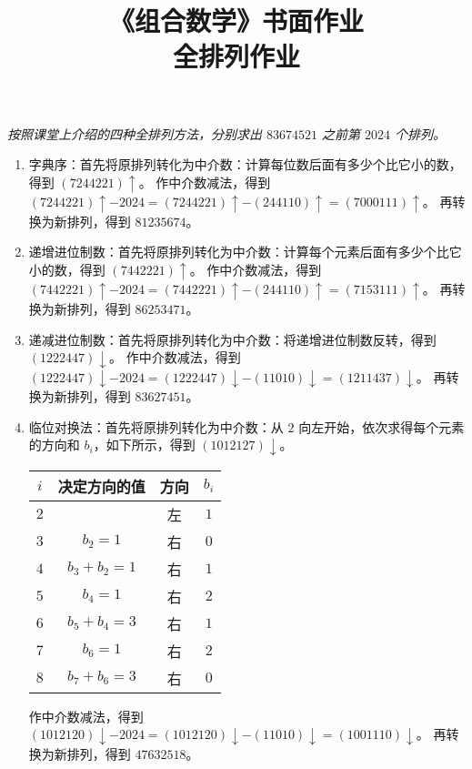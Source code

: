 \documentclass{article}
\title{《组合数学》书面作业 \\
       \large 全排列作业}
\begin{document}
\maketitle

\textit{按照课堂上介绍的四种全排列方法，分别求出 $ 83674521 $ 之前第 $ 2024 $ 个排列。}

\begin{enumerate}
    \item 字典序：首先将原排列转化为中介数：计算每位数后面有多少个比它小的数，得到 $ (7244221)\uparrow $。
    作中介数减法，得到 $ (7244221)\uparrow - 2024 = (7244221)\uparrow - (244110)\uparrow = (7000111)\uparrow $。
    再转换为新排列，得到 $ 81235674 $。
    \item 递增进位制数：首先将原排列转化为中介数：计算每个元素后面有多少个比它小的数，得到 $ (7442221)\uparrow $。
    作中介数减法，得到 $ (7442221)\uparrow - 2024 = (7442221)\uparrow - (244110)\uparrow = (7153111)\uparrow $。
    再转换为新排列，得到 $ 86253471 $。
    \item 递减进位制数：首先将原排列转化为中介数：将递增进位制数反转，得到 $ (1222447)\downarrow $。
    作中介数减法，得到 $ (1222447)\downarrow - 2024 = (1222447)\downarrow - (11010)\downarrow = (1211437)\downarrow $。
    再转换为新排列，得到 $ 83627451 $。
    \item 临位对换法：首先将原排列转化为中介数：从 $ 2 $ 向左开始，依次求得每个元素的方向和 $ b_i $，如下所示，得到 $ (1012127)\downarrow $。
    \begin{center}
    \begin{tabular}{cccc}
        \hline
        $ i $ & 决定方向的值 & 方向 & $ b_i $ \\
        \hline
        $ 2 $ & & 左 & $ 1 $ \\
        $ 3 $ & $ b_2 = 1 $ & 右 & $ 0 $ \\
        $ 4 $ & $ b_3 + b_2 = 1 $ & 右 & $ 1 $ \\
        $ 5 $ & $ b_4 = 1 $ & 右 & $ 2 $ \\
        $ 6 $ & $ b_5 + b_4 = 3 $ & 右 & $ 1 $ \\
        $ 7 $ & $ b_6 = 1 $ & 右 & $ 2 $ \\
        $ 8 $ & $ b_7 + b_6 = 3 $ & 右 & $ 0 $ \\
        \hline
    \end{tabular}
    \end{center}
    作中介数减法，得到 $ (1012120)\downarrow - 2024 = (1012120)\downarrow - (11010)\downarrow = (1001110)\downarrow $。
    再转换为新排列，得到 $ 47632518 $。
\end{enumerate}
\end{document}
